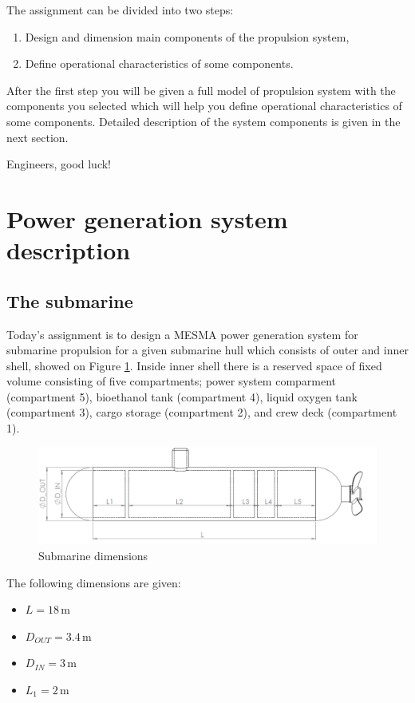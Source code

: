 \documentclass[openany]{book}
\begin{document}
	
	The assignment can be divided into two steps: 
	
	\begin{enumerate}
		\item Design and dimension main components of the propulsion system,
		\item Define operational characteristics of some components.
	\end{enumerate}
	
	After the first step you will be given a full model of propulsion system 
	with the components you selected which will help you define operational 
	characteristics of some components.
	Detailed description of the system components is given in the next section.
	
	Engineers, good luck!
	
	\newpage
	\section{Power generation system description}
	
	
	\subsection{The submarine}
	
	Today's assignment is to design a MESMA power generation system for 
	submarine propulsion for a given submarine hull which consists of outer and 
	inner shell, showed on Figure \ref{fig:side_view}. Inside inner shell 
	there is a reserved space of fixed volume consisting of five compartments;
	power system comparment (compartment 5), bioethanol tank (compartment 4), 
	liquid oxygen tank (compartment 3), cargo storage (compartment 2), and crew 
	deck (compartment 1).
	
	
	\begin{figure}[h!]
		\centering
		\includegraphics[width=\textwidth]{submarine_side_view.png}
		\caption{Submarine dimensions}
		\label{fig:side_view}
	\end{figure}
	
	The following dimensions are given:
	\begin{itemize}
		\item $L = 18 \,\textrm{m}$
		\item $D_{OUT} = 3.4 \,\textrm{m}$
		\item $D_{IN} = 3 \,\textrm{m}$
		\item $L_1 = 2 \,\textrm{m}$
	\end{itemize}
	
\end{document}
